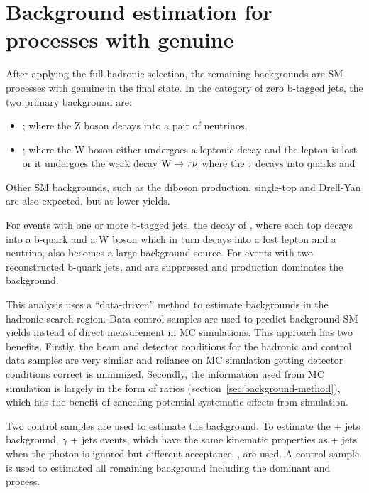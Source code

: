 \clearpage
\section{Background estimation for processes with genuine \texorpdfstring{\met}{MET}\label{sec:backgrounds}}

After applying the full hadronic selection, the remaining 
backgrounds are SM processes with genuine \met in the final state. 
In the category of zero b-tagged jets, the two primary background are:
\begin{itemize}
\item \zj; where the Z boson decays into a pair of neutrinos, 
\item \wj; where the W boson either undergoes a leptonic decay 
and the lepton is lost or it undergoes the weak decay ${\text W} \rightarrow \tau\nu$ where the $\tau$ decays into quarks and 
\end{itemize}
%
Other SM backgrounds, such as the diboson production, single-top and 
Drell-Yan are also expected, but at lower yields.

For events with one or more b-tagged jets, the decay of \ttbar, where each
top decays into a b-quark and a W boson which in turn decays into 
a lost lepton and a neutrino, also becomes a large background source.
For events with two reconstructed b-quark jets, \wj and \zj are suppressed
and \ttbar production dominates the background. 

This analysis uses a ``data-driven'' method to estimate backgrounds
in the hadronic search region. Data control samples are used to predict
background SM yields instead of direct measurement in MC simulations. 
This approach has two benefits. Firstly, the beam and detector conditions 
for the hadronic and control data samples are very similar and reliance on
MC simulation getting detector conditions correct is minimized. Secondly, 
the information used from MC simulation is largely in the form of 
ratios (section~\ref{sec:background-method}), which has the benefit of canceling 
potential systematic effects from simulation.

Two control samples are used to estimate the background. To estimate the
\znunu + jets background, $\gamma$ + jets events, which have the same
kinematic properties as \znunu + jets when the photon is ignored but 
different acceptance~\cite{PAS-SUS-08-002,Bern:2011pa}, are used. A \mj control
sample is used to estimated all remaining background including the 
dominant \wj and \ttbar process.

